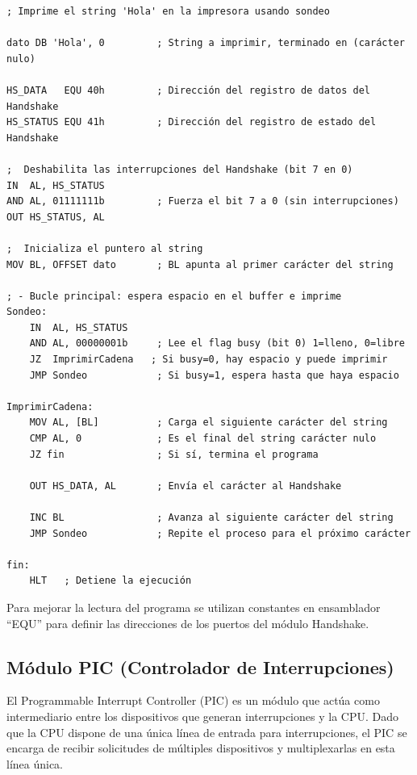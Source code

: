 \documentclass[12pt,oneside]{templates/unerthesis}
\begin{document}
\begin{lstlisting}
; Imprime el string 'Hola' en la impresora usando sondeo

dato DB 'Hola', 0         ; String a imprimir, terminado en (carácter nulo)

HS_DATA   EQU 40h         ; Dirección del registro de datos del Handshake
HS_STATUS EQU 41h         ; Dirección del registro de estado del Handshake

;  Deshabilita las interrupciones del Handshake (bit 7 en 0) 
IN  AL, HS_STATUS
AND AL, 01111111b         ; Fuerza el bit 7 a 0 (sin interrupciones)
OUT HS_STATUS, AL

;  Inicializa el puntero al string 
MOV BL, OFFSET dato       ; BL apunta al primer carácter del string

; - Bucle principal: espera espacio en el buffer e imprime 
Sondeo:
    IN  AL, HS_STATUS
    AND AL, 00000001b     ; Lee el flag busy (bit 0) 1=lleno, 0=libre
    JZ  ImprimirCadena   ; Si busy=0, hay espacio y puede imprimir
    JMP Sondeo            ; Si busy=1, espera hasta que haya espacio

ImprimirCadena:
    MOV AL, [BL]          ; Carga el siguiente carácter del string
    CMP AL, 0             ; Es el final del string carácter nulo
    JZ fin                ; Si sí, termina el programa

    OUT HS_DATA, AL       ; Envía el carácter al Handshake

    INC BL                ; Avanza al siguiente carácter del string
    JMP Sondeo            ; Repite el proceso para el próximo carácter

fin:
    HLT   ; Detiene la ejecución\end{lstlisting}

Para mejorar la lectura del programa se utilizan constantes en ensamblador ``EQU'' para definir las direcciones de los puertos del módulo Handshake.

\hypertarget{pic}{%
\subsection{Módulo PIC (Controlador de Interrupciones)}\label{pic}}

El Programmable Interrupt Controller (PIC) es un módulo que actúa como intermediario entre los dispositivos que generan interrupciones y la CPU. Dado que la CPU dispone de una única línea de entrada para interrupciones, el PIC se encarga de recibir solicitudes de múltiples dispositivos y multiplexarlas en esta línea única.
\end{document}

